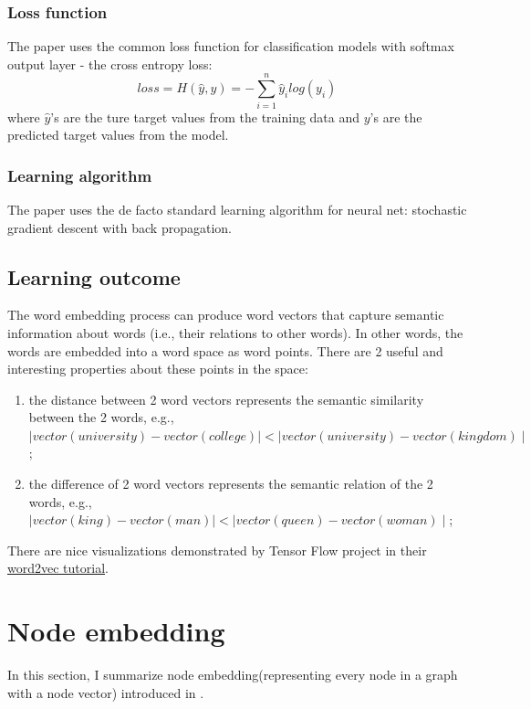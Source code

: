\documentclass{article}
\begin{document}
\subsubsection{Loss function}
The paper uses the common loss function for classification models with softmax output layer - the cross entropy loss:
\begin{equation}
loss = H(\hat{y}, y) = - \sum_{i = 1}^{n} \hat{y}_i log(y_i)
\end{equation}
where $ \hat{y} $'s are the ture target values from the training data and $ y $'s are the predicted target values from the model.

\subsubsection{Learning algorithm}
The paper uses the de facto standard learning algorithm for neural net: stochastic gradient descent with back propagation\cite{lecun2012efficient}.

\subsection{Learning outcome}
The word embedding process can produce word vectors that capture semantic information about words (i.e., their relations to other words). In other words, the words are embedded into a word space as word points. There are 2 useful and interesting properties about these points in the space:
\begin{enumerate}
	\item the distance between 2 word vectors represents the semantic similarity between the 2 words, e.g., $ \mid vector(university) - vector(college) \mid < \mid vector(university) - vector(kingdom) \mid $;
	\item the difference of 2 word vectors represents the semantic relation of the 2 words, e.g., $ \mid vector(king) - vector(man) \mid < \mid vector(queen) - vector(woman) \mid $;
\end{enumerate}
There are nice visualizations demonstrated by Tensor Flow project in their \href{https://www.tensorflow.org/versions/r0.7/tutorials/word2vec/index.html}{word2vec tutorial}.

\section{Node embedding}

In this section, I summarize node embedding(representing every node in a graph with a node vector) introduced in \cite{perozzi2014deepwalk}.
\end{document}
